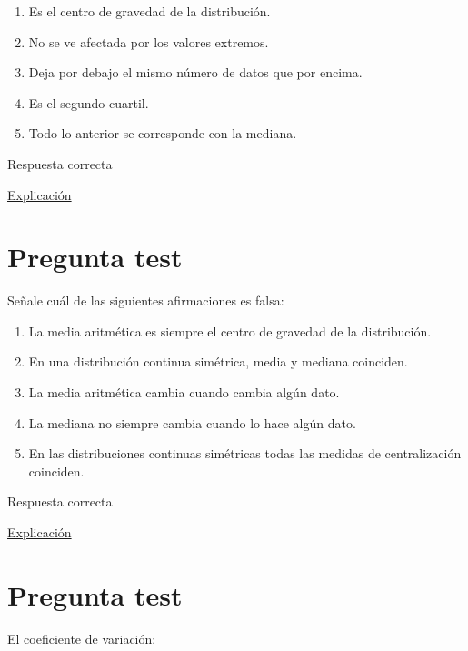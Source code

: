 \documentclass[
]{book}
\providecommand{\tightlist}{%
  \setlength{\itemsep}{0pt}\setlength{\parskip}{0pt}}
\begin{document}
\begin{enumerate}
\def\labelenumi{\alph{enumi})}
\tightlist
\item
  Es el centro de gravedad de la distribución.
\item
  No se ve afectada por los valores extremos.
\item
  Deja por debajo el mismo número de datos que por encima.
\item
  Es el segundo cuartil.
\item
  Todo lo anterior se corresponde con la mediana.
\end{enumerate}

Respuesta correcta

\href{https://1fjmanzano.github.io/bioestadistica/medidas-de-posicio\%CC\%81n-dispersio\%CC\%81n-y-forma.html\#medidas-de-posicio\%CC\%81n-centrales}{Explicación}

\hypertarget{pregunta-test-54}{%
\section{Pregunta test}\label{pregunta-test-54}}

Señale cuál de las siguientes afirmaciones es falsa:

\begin{enumerate}
\def\labelenumi{\alph{enumi})}
\tightlist
\item
  La media aritmética es siempre el centro de gravedad de la distribución.
\item
  En una distribución continua simétrica, media y mediana coinciden.
\item
  La media aritmética cambia cuando cambia algún dato.
\item
  La mediana no siempre cambia cuando lo hace algún dato.
\item
  En las distribuciones continuas simétricas todas las medidas de centralización coinciden.
\end{enumerate}

Respuesta correcta

\href{https://www.statisticshowto.com/what-is-a-bimodal-distribution/}{Explicación}

\hypertarget{pregunta-test-55}{%
\section{Pregunta test}\label{pregunta-test-55}}

El coeficiente de variación:
\end{document}
